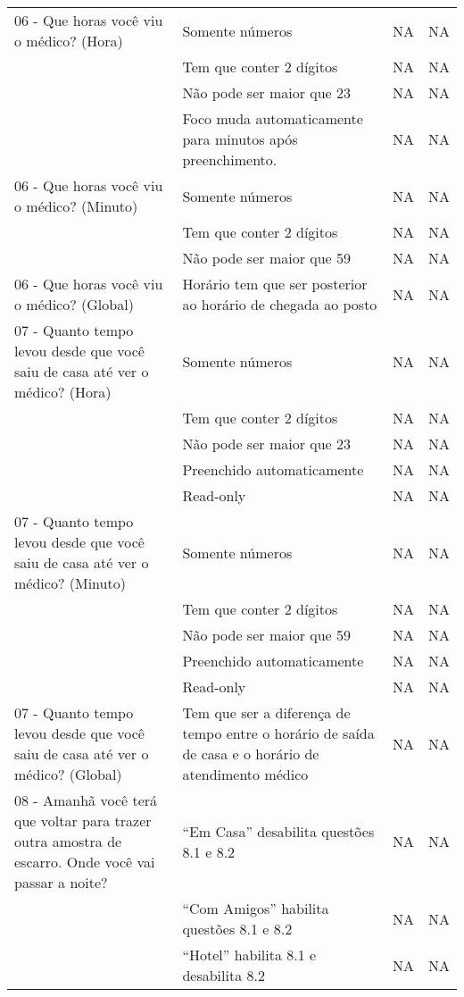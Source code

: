 \begin{longtable}{|p{}|p{}|p{}|p{}|}
06 - Que horas você viu o médico? (Hora) & Somente números & NA & NA \\ \cline{2-4}  & Tem que conter 2 dígitos & NA & NA \\ \cline{2-4} & Não pode ser maior que 23 & NA & NA \\ \cline{2-4} & Foco muda automaticamente para minutos após preenchimento.  & NA & NA \\ \hline
06 - Que horas você viu o médico? (Minuto) & Somente números & NA & NA \\ \cline{2-4}  & Tem que conter 2 dígitos & NA & NA \\ \cline{2-4} & Não pode ser maior que 59 & NA & NA \\ \hline
06 - Que horas você viu o médico? (Global) & Horário tem que ser posterior ao horário de chegada ao posto & NA & NA \\ \hline

07 - Quanto tempo levou desde que você saiu de casa até ver o médico? (Hora) & Somente números & NA & NA \\ \cline{2-4}  & Tem que conter 2 dígitos & NA & NA \\ \cline{2-4} & Não pode ser maior que 23 & NA & NA \\ \cline{2-4} & Preenchido automaticamente  & NA & NA \\ \cline{2-4} & Read-only& NA & NA \\ \hline
07 - Quanto tempo levou desde que você saiu de casa até ver o médico? (Minuto) & Somente números & NA & NA \\ \cline{2-4}  & Tem que conter 2 dígitos & NA & NA \\ \cline{2-4} & Não pode ser maior que 59 & NA & NA \\ \cline{2-4} & Preenchido automaticamente  & NA & NA \\ \cline{2-4} & Read-only & NA & NA \\ \hline
07 - Quanto tempo levou desde que você saiu de casa até ver o médico? (Global) & Tem que ser a diferença de tempo entre o horário de saída de casa e o horário de atendimento médico & NA & NA \\ \hline 

08 - Amanhã você terá que voltar para trazer outra amostra de escarro. Onde você vai passar a noite? & ``Em Casa'' desabilita questões 8.1 e 8.2 & NA & NA \\ \cline{2-4} & ``Com Amigos'' habilita questões 8.1 e 8.2 & NA & NA \\ \cline{2-4} & ``Hotel'' habilita 8.1 e desabilita 8.2 & NA & NA \\ \hline


\end{longtable}
